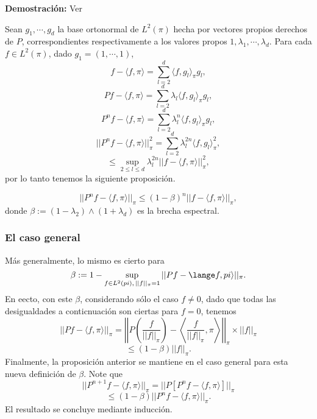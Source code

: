 \textbf{Demostración: }Ver \cite[Pag. 41]{Pard}\\ \newline

Sean $g_1, \cdots, g_d$ la base ortonormal de $L^2(\pi)$ hecha por vectores propios derechos de $P$, correspondientes respectivamente a los valores propos $1,\lambda_1,\cdots, \lambda_d$. Para cada $f\in L^2(\pi)$, dado $g_1 = (1,\cdots,1)$,
\[f-\langle f,\pi \rangle = \sum_{l=2}^d \langle f,g_l \rangle_{\pi}g_l,\]
\[Pf - \langle f,\pi \rangle = \sum_{l=2}^d \lambda_l \langle f,g_l \rangle_{\pi}g_l,\]
\[P^nf - \langle f,\pi \rangle = \sum_{l=2}^d \lambda_l^n \langle f,g_l \rangle_{\pi}g_l,\]
\[|| P^nf -\langle f,\pi \rangle||_{\pi}^2 = \sum_{l=2}^d \lambda_l^{2n}\langle f,g_l\rangle_{\pi}^2,\]
\[\leq \sup_{2\leq l\leq d}\lambda_{l}^{2n}||f-\langle f,\pi \rangle ||_{\pi}^2,\]
por lo tanto tenemos la siguiente proposición.
\begin{prop}
\[||P^nf - \langle f,\pi \rangle ||_{\pi} \leq (1-\beta)^n ||f-\langle f,\pi \rangle ||_{\pi},\]
donde $\beta := (1-\lambda_2)\wedge (1+\lambda_d)$ es la brecha espectral.
\end{prop}

\subsubsection{El caso general}
Más generalmente, lo mismo es cierto para
\[\beta := 1 - \sup_{f\in L^2(pi),\,||f||_{\pi} = 1} ||Pf - \lange f,pi \rangle||_{\pi}.\]
En eecto, con este $\beta$, considerando sólo el caso $f\neq 0$, dado que todas las desigualdades a conticnuación son ciertas para $f=0$, tenemos
\[||Pf -\langle f,\pi \rangle ||_{\pi} = \left|\left| P \left(\frac{f}{||f||_\pi}\right) - \left\langle \frac{f}{||f||_{\pi}},\pi\right\rangle \right|\right|_{\pi} \times ||f||_{\pi}\]
\[\leq (1-\beta)||f||_{\pi}.\]
Finalmente, la proposición anterior se mantiene en el caso general para esta nueva definición de $\beta$. Note que
\[||P^{n+1}f - \langle f,\pi \rangle||_{\pi} = ||P[P^nf - \langle f,\pi \rangle]||_{\pi}\]
\[\leq (1-\beta)||P^nf- \langle f,\pi \rangle||_{\pi}.\]
El resultado se concluye mediante inducción.

